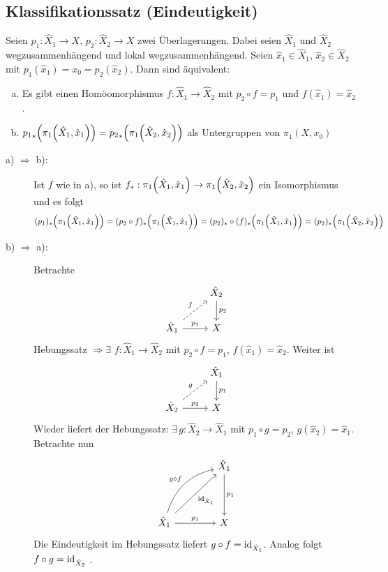 \subsection{Klassifikationssatz (Eindeutigkeit)} %
\label{sub:132}
Seien $p_1 : \hat{X}_1 \to X$, $p_2 : \hat{X}_2 \to X$ zwei Überlagerungen. Dabei seien $\hat{X}_1$ und $\hat{X}_2$ wegzusammenhängend und lokal wegzusammenhängend.
Seien $\hat{x}_1 \in \hat{X}_1$, $\hat{x}_2 \in \hat{X}_2$ mit $p_1(\hat{x}_1) = x_0 = p_2(\hat{x}_2)$.
Dann sind äquivalent:
\begin{enumerate}[a)]
	\item Es gibt einen Homöomorphismus $f : \hat{X}_1 \to \hat{X}_2$ mit $p_2 \circ f = p_1$ und $f(\hat{x}_1) = \hat{x}_2$.
	\item ${p_1}_*\enbrace*{\pi_1 \enbrace*{\hat{X}_1, \hat{x}_1}} = {p_2}_* \enbrace*{\pi_1 \enbrace*{\hat{X}_2, \hat{x}_2}}$ als Untergruppen von $\pi_1(X,x_0)$
\end{enumerate}
\begin{description}
	\item[a) $\Rightarrow$ b):] Ist $f$ wie in a), so ist $f_* : \pi_1 \enbrace*{\hat{X}_1, \hat{x}_1} \to \pi_1 \enbrace*{\hat{X}_2, \hat{x}_2}$ ein Isomorphismus und es 
	folgt 
	\[
		(p_1)_* \enbrace*{\pi_1 \enbrace*{\hat{X}_1, \hat{x}_1}} =  (p_2 \circ f)_* \enbrace*{\pi_1 \enbrace*{\hat{X}_1, \hat{x}_1}} 
		= (p_2)_* \circ (f)_* \enbrace*{\pi_1 \enbrace*{\hat{X}_1, \hat{x}_1}} = (p_2)_* \enbrace*{\pi_1 \enbrace*{\hat{X}_2, \hat{x}_2}}
	\]
	\item[b) $\Rightarrow$ a):] Betrachte
	\[
		\begin{tikzcd}
			\mbox{ } & \hat{X}_2 \dar{p_2}\\
			\hat{X}_1 \rar{p_1} \urar[dashed]{f}& X
		\end{tikzcd}
	\]
	Hebungssatz $\Rightarrow \exists$ $f : \hat{X}_1 \to \hat{X}_2$ mit $p_2 \circ f = p_1$, $f(\hat{x}_1) = \hat{x}_2$. Weiter ist
	\[
		\begin{tikzcd}
			\mbox{} & \hat{X}_1\dar{p_1} \\
			\hat{X}_2 \rar{p_2} \urar[dashed]{g}&  X
		\end{tikzcd}
	\]
	Wieder liefert der Hebungssatz: $\exists \, g : \hat{X}_2 \to \hat{X}_1$ mit $p_1 \circ  g = p_2$, $g(\hat{x}_2) = \hat{x}_1$. Betrachte nun
	\[
		\begin{tikzcd}[column sep=4em, row sep=4em]
			\mbox{ } & \hat{X}_1 \dar{p_1}\\
			\hat{X}_1 \rar{p_1} \urar[swap]{\id_{\hat{X}_1}} \urar[bend left]{g \circ f} & X
		\end{tikzcd}
	\]
	Die Eindeutigkeit im Hebungssatz liefert $g \circ f = \operatorname{id}_{\hat{X}_1}$. Analog folgt $f \circ g = \operatorname{id}_{\hat{X}_2}$ \bewende.
\end{description}

